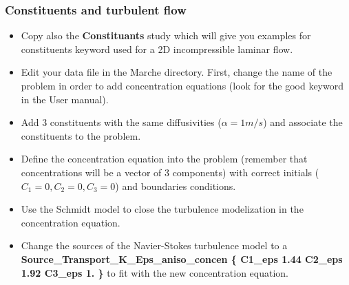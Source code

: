 \documentclass[10pt]{beamer}
\begin{document}
\begin{frame}
\frametitle{Constituents and turbulent flow}
\begin{block}{}

\begin{itemize}
\item Copy also the \textbf{Constituants} study which will give you examples for constituents keyword used for a 2D incompressible laminar flow.

\item Edit your data file in the Marche directory. First, change the name of the problem in order to add concentration equations (look for the good keyword in the User manual).

\item Add 3 constituents with the same diffusivities ($\alpha=1m/s$) and associate the constituents to the problem.

\item Define the concentration equation into the problem (remember that concentrations will be a vector of 3 components) with correct initials ($C_1=0, C_2=0, C_3=0$) and boundaries conditions.

\item Use the Schmidt model to close the turbulence modelization in the  concentration equation.

\item Change the sources of the Navier-Stokes turbulence model to a \textbf{Source\_Transport\_K\_Eps\_aniso\_concen \{ C1\_eps 1.44 C2\_eps 1.92 C3\_eps 1. \} } to fit with the new concentration equation.
\end{itemize}

\end{block}
\end{frame}
\end{document}
